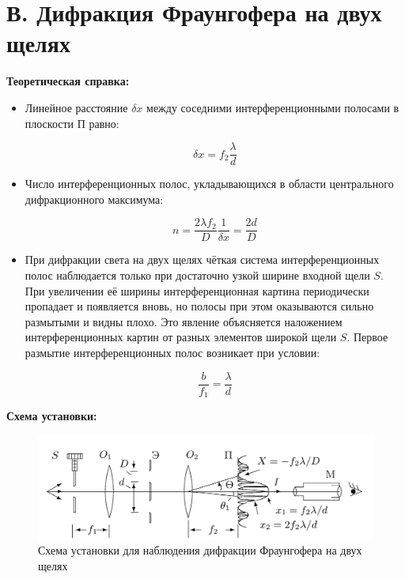 \documentclass[a4paper, 12pt]{article}
\begin{document}
\section*{В. Дифракция Фраунгофера на двух щелях}

\textbf{Теоретическая справка:}

\begin{itemize}
    \item Линейное расстояние $\delta x$ между соседними интерференционными полосами в плоскости П равно:
    
    \begin{equation*}
        \delta x = f_2 \dfrac{\lambda}{d}
    \end{equation*}

    \item Число интерференционных полос, укладывающихся в области центрального дифракционного максимума:
    
    \begin{equation*}
        n = \dfrac{2 \lambda f_2}{D} \dfrac{1}{\delta x} = \dfrac{2 d}{D}
    \end{equation*}

    \item При дифракции света на двух щелях чёткая система интерференционных полос наблюдается только при достаточно узкой ширине входной щели $S$. При увеличении её ширины интерференционная картина периодически пропадает и появляется вновь, но полосы при этом оказываются сильно размытыми и видны плохо. Это явление объясняется наложением интерференционных картин от разных элементов широкой щели $S$.
    Первое размытие интерференционных полос возникает при условии:

    \begin{equation*}
        \dfrac{b}{f_1} = \dfrac{\lambda}{d}
    \end{equation*}
\end{itemize}

\newpage

\textbf{Схема установки:}

\begin{figure}[!h]
    \centering
    \includegraphics[scale=0.3]{pic3.png}
    \caption{Схема установки для наблюдения дифракции Фраунгофера на двух щелях}   
    \label{pic3} 
\end{figure}
\end{document}

